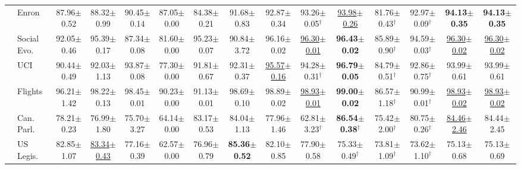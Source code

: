 \begin{table}[t]
{\begin{tabular}{llccccccccccccc}
 & Enron & 87.96{\scriptsize$\pm$0.52} & 88.32{\scriptsize$\pm$0.99} & 90.45{\scriptsize$\pm$0.14} & 87.05{\scriptsize$\pm$0.00} & 84.38{\scriptsize$\pm$0.21} & 91.68{\scriptsize$\pm$0.83} & 92.87{\scriptsize$\pm$0.34} & 93.26{\scriptsize$\pm$0.05}$^\dagger$ & \underline{93.98{\scriptsize$\pm$0.26}} & 81.76{\scriptsize$\pm$0.43}$^\dagger$ & 92.97{\scriptsize$\pm$0.09}$^\dagger$ & \textbf{94.13{\scriptsize$\pm$0.35}} & \textbf{94.13{\scriptsize$\pm$0.35}} \\
 & Social Evo. & 92.05{\scriptsize$\pm$0.46} & 95.39{\scriptsize$\pm$0.17} & 87.34{\scriptsize$\pm$0.08} & 81.60{\scriptsize$\pm$0.00} & 95.23{\scriptsize$\pm$0.07} & 90.84{\scriptsize$\pm$3.72} & 96.16{\scriptsize$\pm$0.02} & \underline{96.30{\scriptsize$\pm$0.01}} & \textbf{96.43{\scriptsize$\pm$0.02}} & 85.89{\scriptsize$\pm$0.90}$^\dagger$ & 94.59{\scriptsize$\pm$0.03}$^\dagger$ & \underline{96.30{\scriptsize$\pm$0.02}} & \underline{96.30{\scriptsize$\pm$0.02}} \\
 & UCI & 90.44{\scriptsize$\pm$0.49} & 92.03{\scriptsize$\pm$1.13} & 93.87{\scriptsize$\pm$0.08} & 77.30{\scriptsize$\pm$0.00} & 91.81{\scriptsize$\pm$0.67} & 92.31{\scriptsize$\pm$0.37} & \underline{95.57{\scriptsize$\pm$0.16}} & 94.28{\scriptsize$\pm$0.31}$^\dagger$ & \textbf{96.79{\scriptsize$\pm$0.05}} & 84.79{\scriptsize$\pm$0.51}$^\dagger$ & 92.86{\scriptsize$\pm$0.75}$^\dagger$ & 93.99{\scriptsize$\pm$0.61} & 93.99{\scriptsize$\pm$0.61} \\
 & Flights & 96.21{\scriptsize$\pm$1.42} & 98.22{\scriptsize$\pm$0.13} & 98.45{\scriptsize$\pm$0.01} & 90.23{\scriptsize$\pm$0.00} & 91.13{\scriptsize$\pm$0.01} & 98.69{\scriptsize$\pm$0.10} & 98.89{\scriptsize$\pm$0.02} & \underline{98.93{\scriptsize$\pm$0.01}} & \textbf{99.00{\scriptsize$\pm$0.02}} & 86.57{\scriptsize$\pm$1.18}$^\dagger$ & 90.99{\scriptsize$\pm$0.01}$^\dagger$ & \underline{98.93{\scriptsize$\pm$0.02}} & \underline{98.93{\scriptsize$\pm$0.02}} \\
 & Can. Parl. & 78.21{\scriptsize$\pm$0.23} & 76.99{\scriptsize$\pm$1.80} & 75.70{\scriptsize$\pm$3.27} & 64.14{\scriptsize$\pm$0.00} & 83.17{\scriptsize$\pm$0.53} & 84.04{\scriptsize$\pm$1.13} & 77.96{\scriptsize$\pm$1.46} & 62.81{\scriptsize$\pm$3.23}$^\dagger$ & \textbf{86.54{\scriptsize$\pm$0.38}}$^\dagger$ & 75.42{\scriptsize$\pm$2.00}$^\dagger$ & 80.75{\scriptsize$\pm$0.26}$^\dagger$ & \underline{84.46{\scriptsize$\pm$2.46}} & 84.44{\scriptsize$\pm$2.45} \\
 & US Legis. & 82.85{\scriptsize$\pm$1.07} & \underline{83.34{\scriptsize$\pm$0.43}} & 77.16{\scriptsize$\pm$0.39} & 62.57{\scriptsize$\pm$0.00} & 76.96{\scriptsize$\pm$0.79} & \textbf{85.36{\scriptsize$\pm$0.52}} & 82.10{\scriptsize$\pm$0.85} & 77.90{\scriptsize$\pm$0.58} & 75.33{\scriptsize$\pm$0.49}$^\dagger$ & 73.81{\scriptsize$\pm$1.09}$^\dagger$ & 73.62{\scriptsize$\pm$1.10}$^\dagger$ & 75.13{\scriptsize$\pm$0.68} & 75.13{\scriptsize$\pm$0.69} \\

\end{tabular}}
\end{table}
